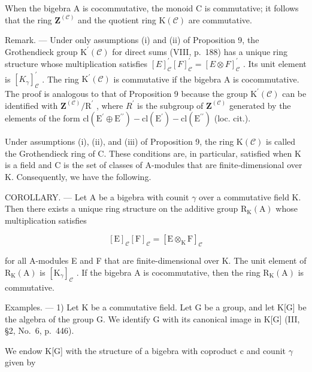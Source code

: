 When the bigebra A is cocommutative, the monoid C is commutative; it follows that the ring \(\mathbf{Z}^{(\mathcal{C})}\) and the quotient ring \(\mathrm{K}(\mathcal{C})\) are commutative.

Remark. --- Under only assumptions (i) and (ii) of Proposition 9, the Grothendieck group \(\mathrm{K}^{\prime}(\mathcal{C})\) for direct sums (VIII, p.~188) has a unique ring structure whose multiplication satisfies \([E]_{\mathcal{C}}^{\prime}[F]_{\mathcal{C}}^{\prime} = [E \otimes F]_{\mathcal{C}}^{\prime}\) . Its unit element is \([K_{\gamma}]_{\mathcal{C}}^{\prime}\) . The ring \(\mathrm{K}^{\prime}(\mathcal{C})\) is commutative if the bigebra A is cocommutative. The proof is analogous to that of Proposition 9 because the group \(\mathrm{K}^{\prime}(\mathcal{C})\) can be identified with \(\mathbf{Z}^{(\mathcal{C})}/\mathrm{R}^{\prime}\) , where \(R^{\prime}\) is the subgroup of \(\mathbf{Z}^{(\mathcal{C})}\) generated by the elements of the form \(\mathrm{cl}(\mathrm{E}^{\prime} \oplus \mathrm{E}^{\prime\prime}) - \mathrm{cl}(\mathrm{E}^{\prime}) - \mathrm{cl}(\mathrm{E}^{\prime\prime})\) (loc. cit.).

Under assumptions (i), (ii), and (iii) of Proposition 9, the ring \(\mathrm{K}(\mathcal{C})\) is called the Grothendieck ring of C. These conditions are, in particular, satisfied when K is a field and C is the set of classes of A-modules that are finite-dimensional over K. Consequently, we have the following.

COROLLARY. --- Let A be a bigebra with counit \(\gamma\) over a commutative field K. Then there exists a unique ring structure on the additive group \(\mathrm{R}_{\mathrm{K}}(\mathrm{A})\) whose multiplication satisfies

\[
[ \mathrm{E} ] _ {\mathcal {C}} [ \mathrm{F} ] _ {\mathcal {C}} = [ \mathrm{E} \otimes_ {\mathrm{K}} \mathrm{F} ] _ {\mathcal {C}}
\]

for all A-modules E and F that are finite-dimensional over K. The unit element of \(\mathrm{R}_{\mathrm{K}}(\mathrm{A})\) is \([\mathrm{K}_{\gamma}]_{\mathcal{C}}\) . If the bigebra A is cocommutative, then the ring \(\mathrm{R}_{\mathrm{K}}(\mathrm{A})\) is commutative.

Examples. --- 1) Let K be a commutative field. Let G be a group, and let K{[}G{]} be the algebra of the group G. We identify G with its canonical image in K{[}G{]} (III, §2, No.~6, p.~446).

We endow K{[}G{]} with the structure of a bigebra with coproduct c and counit \(\gamma\) given by

